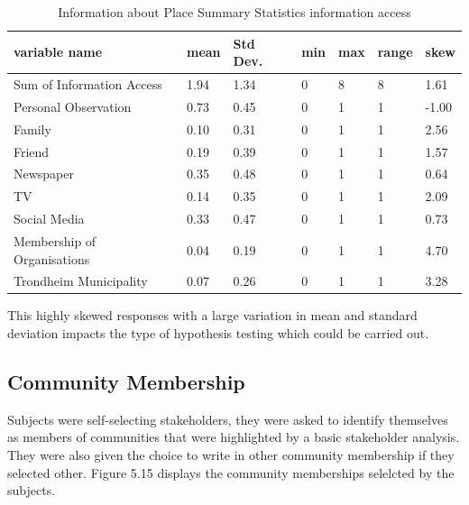 \begin{center}
\begin{table}[h!]
    \centering
    \begin{tabular}{|l|l|l|l|l|l|l|}
    \hline
        variable name & mean & Std Dev. & min & max & range & skew  \\ \hline
        Sum of Information Access & 1.94 & 1.34 & 0 & 8 & 8 & 1.61 \\ \hline
        Personal Observation & 0.73 & 0.45 & 0 & 1 & 1 & -1.00  \\ \hline
        Family & 0.10 & 0.31 & 0 & 1 & 1 & 2.56 \\ \hline
        Friend & 0.19 & 0.39 & 0 & 1 & 1 & 1.57  \\ \hline
        Newspaper & 0.35 & 0.48 & 0 & 1 & 1 & 0.64  \\ \hline
        TV & 0.14 & 0.35 & 0 & 1 & 1 & 2.09 \\ \hline
       Social Media & 0.33 & 0.47 & 0 & 1 & 1 & 0.73  \\ \hline
        Membership of Organisations & 0.04 & 0.19 & 0 & 1 & 1 & 4.70 \\ \hline
        Trondheim Municipality & 0.07 & 0.26 & 0 & 1 & 1 & 3.28\\ \hline
                
         \end{tabular}
    \caption{Information about Place Summary Statistics information access}
\label{table:summary_stats_info_access}
\end{table}
\end{center}

This highly skewed responses with a large variation in mean and standard deviation impacts the type of hypothesis testing which could be carried out. 

\subsection{Community Membership}
Subjects were self-selecting stakeholders, they were asked to identify themselves as members of communities that were highlighted by a basic stakeholder analysis. They were also given the choice to write in other community membership if they selected other. Figure 5.15 displays the community memberships selelcted by the subjects. 


